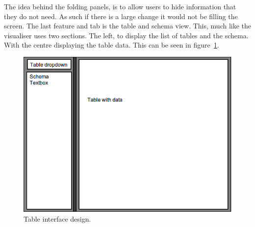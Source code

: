 The idea behind the folding panels,  is to allow users to hide information that they do not need. As such if there is a large change it would not be filling the screen. The last feature and tab is the table and schema view. This, much like the visualiser uses two sections. The left, to display the list of tables and the schema. With the centre displaying the table data. This can be seen in figure~\ref{fig:des_ui_table}. 

\begin{figure}[H]
	\centering
	\includegraphics[scale=0.32]{images/ui_table.png}
	\caption{Table interface design.}
	\label{fig:des_ui_table}
\end{figure}
